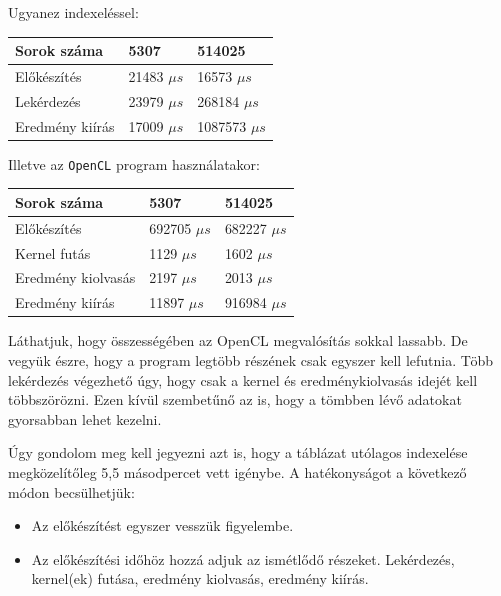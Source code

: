 Ugyanez indexeléssel:

\begin{table}[h!]
\centering
\begin{tabular}{|p{6cm}|p{3cm}|p{3cm}|}
\hline
Sorok száma & 5307 & 514025 \\
\hline
\hline

Előkészítés & 21483 $\mu s$ & 16573 $\mu s$ \\
\hline

Lekérdezés & 23979 $\mu s$ & 268184 $\mu s$ \\
\hline

Eredmény kiírás & 17009 $\mu s$ & 1087573 $\mu s$ \\
\hline
\end{tabular}
\end{table}

Illetve az \texttt{OpenCL} program használatakor:

\begin{table}[h!]
\centering
\begin{tabular}{|p{6cm}|p{3cm}|p{3cm}|}
\hline
Sorok száma & 5307 & 514025 \\
\hline
\hline
Előkészítés & 692705 $\mu s$ & 682227 $\mu s$ \\
\hline
Kernel futás & 1129 $\mu s$ & 1602 $\mu s$ \\
\hline
Eredmény kiolvasás & 2197 $\mu s$ & 2013 $\mu s$ \\
\hline
Eredmény kiírás & 11897 $\mu s$ & 916984 $\mu s$ \\
\hline
\end{tabular}
\end{table}

Láthatjuk, hogy összességében az OpenCL megvalósítás sokkal lassabb. De vegyük észre, hogy a program legtöbb részének csak egyszer kell lefutnia. 
Több lekérdezés végezhető úgy, hogy csak a  kernel és eredménykiolvasás idejét kell többszörözni. Ezen kívül szembetűnő az is, hogy a tömbben lévő adatokat gyorsabban lehet kezelni.

Úgy gondolom meg kell jegyezni azt is, hogy a táblázat utólagos indexelése megközelítőleg 5,5 másodpercet vett igénybe.
\newline A hatékonyságot a következő módon becsülhetjük:
\begin{itemize}
\item Az előkészítést egyszer vesszük figyelembe.
\item Az előkészítési időhöz hozzá adjuk az ismétlődő részeket.
Lekérdezés, kernel(ek) futása, eredmény kiolvasás, eredmény kiírás.
\end{itemize}

